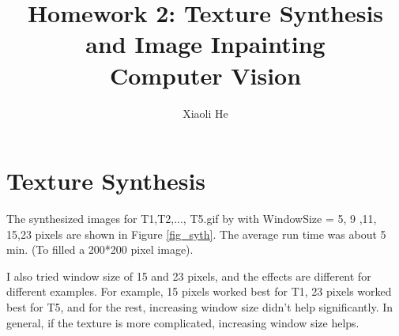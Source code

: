 \documentclass{extarticle}
\theoremstyle{definition}
\theoremstyle{definition}
\begin{document}
\title{Homework 2: Texture Synthesis and Image Inpainting \\
	Computer Vision}
\author{Xiaoli He}
\maketitle
\newpage

\section{Texture Synthesis}
The synthesized images for T1,T2,..., T5.gif by with WindowSize = 5, 9 ,11, 15,23 pixels are shown in Figure \ref{fig_syth}. The average run time was about 5 min. (To filled a 200*200 pixel image).

I also tried window size of 15 and 23 pixels, and the effects are different for different examples. For example, 15 pixels worked best for T1, 23 pixels worked best for T5, and for the rest, increasing window size didn't help significantly. In general, if the texture is more complicated, increasing window size helps. 
\end{document}
